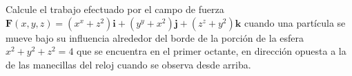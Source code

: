 \item Calcule el trabajo efectuado por el campo de fuerza $\mathbf{F}(x, y, z) = (x^x + z^2) \mathbf{i} + (y^y + x^2) \mathbf{j} + (z^z + y^2) \mathbf{k}$ cuando una partícula se mueve bajo su influencia alrededor del borde de la porción de la esfera $x^2 + y^2 + z^2 = 4$ que se encuentra en el primer octante, en dirección opuesta a la de las manecillas del reloj cuando se observa desde arriba.
